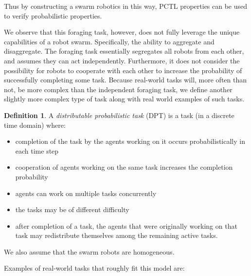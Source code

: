\documentclass[11pt]{article}
\theoremstyle{definition}
\newtheorem{defn}{Definition}
\begin{document}
Thus by constructing a swarm robotics in this way,
PCTL properties can be used to verify probabilistic
properties.

We observe that this foraging task, however, does
not fully leverage the unique capabilities of
a robot swarm. Specifically, the ability
to aggregate and disaggregate. The foraging
task essentially segregates all robots from
each other, and assumes they can act
independently. Furthermore, it does not
consider the possibility for robots to
cooperate with each other to increase
the probability of successfully completing
some task. Because real-world tasks will,
more often than not, be more complex than
the independent foraging task, we define
another slightly more complex type of task
along with real world examples of such tasks.

\begin{defn}
    A \emph{distributable probabilistic task}
    (DPT) is a task (in a discrete time domain)
    where:

    \begin{itemize}
        \item completion of the task by
            the agents working on it
            occurs probabilistically in
            each time step
        \item cooperation of agents working
            on the same task increases the
            completion probability
        \item agents can work on multiple
            tasks concurrently
        \item the tasks may be of different
            difficulty
        \item after completion of a task,
            the agents that were originally
            working on that task may
            redistribute themselves
            among the remaining active tasks.
    \end{itemize}

    We also assume that the swarm robots
    are homogeneous.
\end{defn}

Examples of real-world tasks that roughly
fit this model are:
\end{document}
